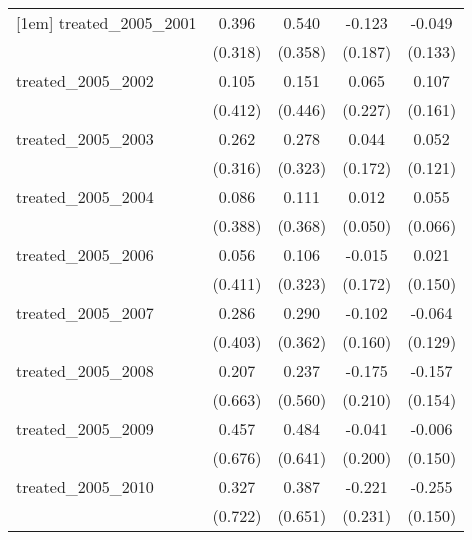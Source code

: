 {\begin{tabular}{l*{4}{c}}
[1em]
treated\_2005\_2001&       0.396         &       0.540         &      -0.123         &      -0.049         \\
            &     (0.318)         &     (0.358)         &     (0.187)         &     (0.133)         \\
[1em]
treated\_2005\_2002&       0.105         &       0.151         &       0.065         &       0.107         \\
            &     (0.412)         &     (0.446)         &     (0.227)         &     (0.161)         \\
[1em]
treated\_2005\_2003&       0.262         &       0.278         &       0.044         &       0.052         \\
            &     (0.316)         &     (0.323)         &     (0.172)         &     (0.121)         \\
[1em]
treated\_2005\_2004&       0.086         &       0.111         &       0.012         &       0.055         \\
            &     (0.388)         &     (0.368)         &     (0.050)         &     (0.066)         \\
[1em]
treated\_2005\_2006&       0.056         &       0.106         &      -0.015         &       0.021         \\
            &     (0.411)         &     (0.323)         &     (0.172)         &     (0.150)         \\
[1em]
treated\_2005\_2007&       0.286         &       0.290         &      -0.102         &      -0.064         \\
            &     (0.403)         &     (0.362)         &     (0.160)         &     (0.129)         \\
[1em]
treated\_2005\_2008&       0.207         &       0.237         &      -0.175         &      -0.157         \\
            &     (0.663)         &     (0.560)         &     (0.210)         &     (0.154)         \\
[1em]
treated\_2005\_2009&       0.457         &       0.484         &      -0.041         &      -0.006         \\
            &     (0.676)         &     (0.641)         &     (0.200)         &     (0.150)         \\
[1em]
treated\_2005\_2010&       0.327         &       0.387         &      -0.221         &      -0.255         \\
            &     (0.722)         &     (0.651)         &     (0.231)         &     (0.150)         \\

\end{tabular}}
